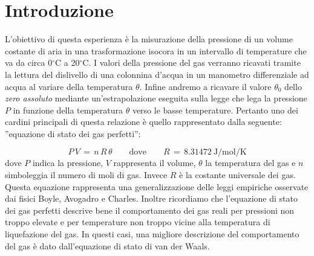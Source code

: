 \section{Introduzione}
L'obiettivo di questa esperienza è la misurazione della pressione di un volume costante di aria in una trasformazione isocora in un intervallo di temperature che va da circa 0$^\circ$C a 20$^\circ$C. I valori della pressione del gas verranno ricavati tramite la lettura del dislivello di una colonnina d'acqua in un manometro differenziale ad acqua al variare della temperatura $\theta$.
Infine andremo a ricavare il valore $\theta_0$ dello \emph{zero assoluto} mediante un'estrapolazione eseguita sulla legge che lega la pressione $P$ in funzione della temperatura $\theta$ verso le basse temperature.
Pertanto uno dei cardini principali di questa relazione è quello rappresentato dalla seguente: ''equazione di stato dei gas perfetti'':

\begin{equation}
	P \, V \,=\, n \, R \, \theta \quad\quad \text{dove} \quad\quad R \,=\, \SI{8.31472}{\joule\per\mole\per\kelvin}
	\label{eq:legge_stato_gas}
\end{equation}
%
dove $P$ indica la pressione, $V$ rappresenta il volume, $\theta$ la temperatura del gas e $n$ simboleggia il numero di moli di gas. Invece $R$ è la costante universale dei gas.\\

Questa equazione rappresenta una generalizzazione delle leggi empiriche osservate dai fisici Boyle, Avogadro e Charles. Inoltre ricordiamo che l'equazione di stato dei gas perfetti descrive bene il comportamento dei gas reali per pressioni non troppo elevate e per temperature non troppo vicine alla temperatura di liquefazione del gas. In questi casi, una migliore descrizione del comportamento del gas è dato dall'equazione di stato di van der Waals.
